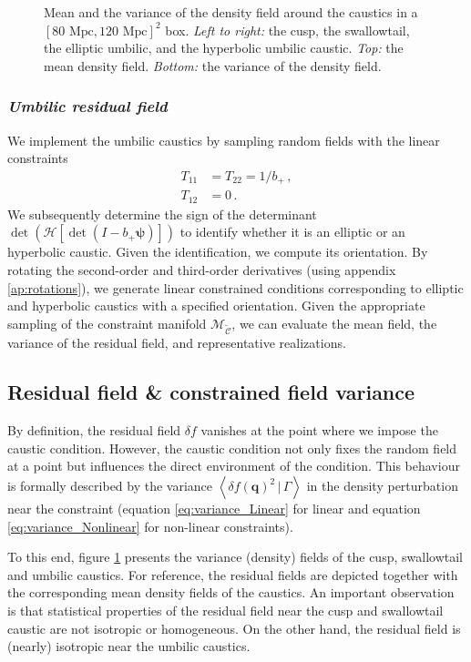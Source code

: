 \documentclass[a4paper, 11pt]{article}
\begin{document}
\begin{figure}
\begin{subfigure}[b]{0.24\textwidth}
\end{subfigure}
\caption{Mean and the variance of the density field around the caustics in a $[80\text{ Mpc},120 \text{ Mpc}]^2$ box. \textit{Left to right:} the cusp, the swallowtail, the elliptic umbilic, and the hyperbolic umbilic caustic. \textit{Top:} the mean density field. \textit{Bottom:} the variance of the density field.}\label{fig:mean_var_dens}
\end{figure}

\subsubsection{{\it Umbilic residual field}}
We implement the umbilic caustics by sampling random fields with the linear constraints
\begin{align}
T_{11}&=T_{22}=1/b_+\,,\\
T_{12}&=0\,.
\end{align}
We subsequently determine the sign of the determinant $\det\left( \mathcal{H}\left[\det (I- b_+ \bm{\psi})\right]\right)$ to identify whether it is an elliptic or an hyperbolic caustic. Given the identification, we compute its orientation. By rotating the second-order and third-order derivatives (using appendix \ref{ap:rotations}), we generate linear constrained conditions corresponding to elliptic and hyperbolic caustics with a specified orientation. Given the appropriate sampling of the constraint manifold $\mathcal{M}_\mathcal{\tilde C}$, we can evaluate the mean field, the variance of the residual field, and representative realizations.

\subsection{Residual field \& constrained field variance}
By definition, the residual field $\delta f$ vanishes at the point where we impose the caustic condition. However, the caustic condition not only fixes the random field at a point but influences the direct environment of the condition. This behaviour is formally described by the variance $\left \langle \delta f (\bm{q})^2\,|\,\Gamma\right\rangle$ in the density perturbation near the constraint (equation \eqref{eq:variance_Linear} for linear and equation \eqref{eq:variance_Nonlinear} for non-linear constraints).

To this end, figure \ref{fig:mean_var_dens} presents the variance (density) fields of the cusp, swallowtail and umbilic caustics.
For reference, the residual fields are depicted together with the corresponding mean density fields of the caustics. An important observation is that statistical properties of the residual field near the cusp and swallowtail caustic are not isotropic or homogeneous. On the other hand, the residual field is (nearly) isotropic near the umbilic caustics.
\end{document}
